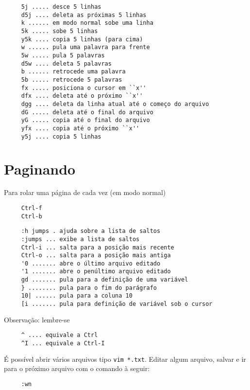 \begin{verbatim}
     5j ..... desce 5 linhas
     d5j .... deleta as próximas 5 linhas
     k ...... em modo normal sobe uma linha
     5k ..... sobe 5 linhas
     y5k .... copia 5 linhas (para cima)
     w ...... pula uma palavra para frente
     5w ..... pula 5 palavras
     d5w .... deleta 5 palavras
     b ...... retrocede uma palavra
     5b ..... retrocede 5 palavras
     fx ..... posiciona o cursor em ``x''
     dfx .... deleta até o próximo ``x''
     dgg .... deleta da linha atual até o começo do arquivo
     dG ..... deleta até o final do arquivo
     yG ..... copia até o final do arquivo
     yfx .... copia até o próximo ``x''
     y5j .... copia 5 linhas
\end{verbatim}

\section{Paginando}
\label{Paginando}

Para rolar uma página de cada vez (em modo normal)

\begin{verbatim}
     Ctrl-f
     Ctrl-b
\end{verbatim}

\begin{verbatim}
     :h jumps . ajuda sobre a lista de saltos
     :jumps ... exibe a lista de saltos
     Ctrl-i ... salta para a posição mais recente
     Ctrl-o ... salta para a posição mais antiga
     '0 ....... abre o último arquivo editado
     '1 ....... abre o penúltimo arquivo editado
     gd ....... pula para a definição de uma variável
     } ........ pula para o fim do parágrafo
     10| ...... pula para a coluna 10
     [i ....... pula para definição de variável sob o cursor
\end{verbatim}

Observação: lembre-se

\begin{verbatim}
     ^ .... equivale a Ctrl
     ^I ... equivale a Ctrl-I
\end{verbatim}

É possível abrir vários arquivos tipo \verb|vim *.txt|. Editar
algum arquivo, salvar e ir para o próximo arquivo com o comando à
seguir:

\begin{verbatim}
     :wn
\end{verbatim}

